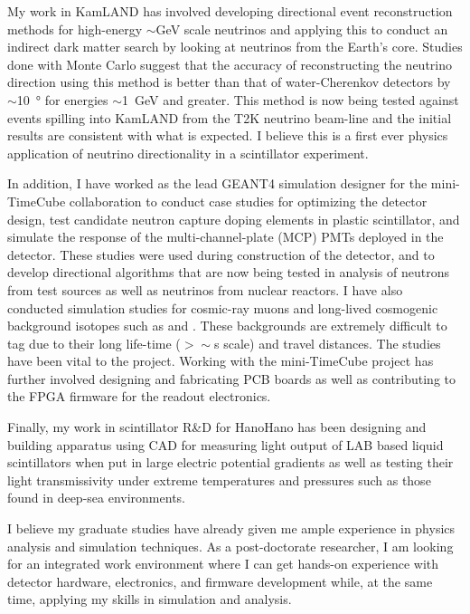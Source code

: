\documentclass[a4paper,10pt]{article} %
\begin{document}
My work in KamLAND has involved developing directional event reconstruction
methods for high-energy $\sim$\si{\giga\electronvolt} scale neutrinos and
applying this to conduct an indirect dark matter search by looking at neutrinos
from the Earth's core. Studies done with Monte Carlo suggest that the accuracy
of reconstructing the neutrino direction using this method is better than that
of water-Cherenkov detectors by $\sim$\SI{10}{\degree} for energies
$\sim$\SI{1}{\giga\electronvolt} and greater. This method is now being tested
against events spilling into KamLAND from the T2K neutrino beam-line and the
initial results are consistent with what is expected. I believe this is a first
ever physics application of neutrino directionality in a scintillator
experiment.

In addition, I have worked as the lead GEANT4 simulation designer for the
mini-TimeCube collaboration to conduct case studies for optimizing the detector
design, test candidate neutron capture doping elements in plastic scintillator,
and simulate the response of the multi-channel-plate (MCP) PMTs deployed in the
detector. These studies were used during construction of the detector, and to
develop directional algorithms that are now being tested in analysis of neutrons
from test sources as well as neutrinos from nuclear reactors. I have also
conducted simulation studies for cosmic-ray muons and long-lived cosmogenic
background isotopes such as  and . These backgrounds are
extremely difficult to tag due to their long life-time ($>\sim$\si{\second}
scale) and travel distances. The studies have been vital to the project. Working
with the mini-TimeCube project has further involved designing and fabricating
PCB boards as well as contributing to the FPGA firmware for the readout
electronics.

Finally, my work in scintillator R\&D for HanoHano has been designing and
building apparatus using CAD for measuring light output of LAB based liquid
scintillators when put in large electric potential gradients as well as testing
their light transmissivity under extreme temperatures and pressures such as
those found in deep-sea environments.

I believe my graduate studies have already given me ample experience in physics
analysis and simulation techniques. As a post-doctorate researcher, I am looking
for an integrated work environment where I can get hands-on experience with
detector hardware, electronics, and firmware development while, at the same
time, applying my skills in simulation and analysis.
\end{document}
